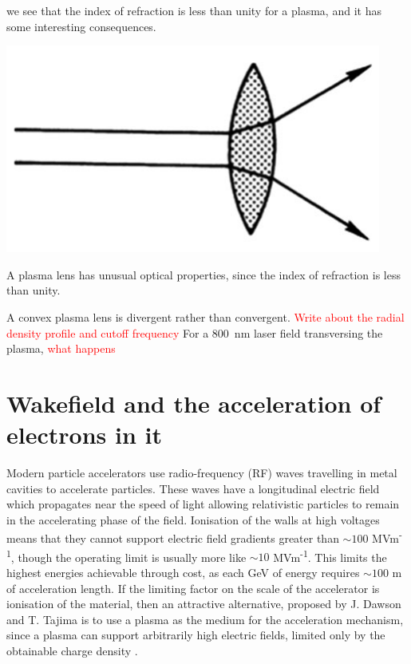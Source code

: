 \documentclass[justified,nofonts,nobib]{tufte-book}
\begin{document}
we see that the index of refraction is less than unity for a plasma, and it has some interesting consequences.
\begin{marginfigure}
    \includegraphics[width=\marginparwidth]{figures/chen4_30.PNG}
    \caption{A plasma lens has unusual optical properties, since the index of refraction is less than unity.}
    \label{fig:plasma_lens_chen}
\end{marginfigure}
A convex plasma lens is divergent rather than convergent.
\textcolor{red}{Write about the radial density profile and cutoff frequency}
For a \SI{800}{\nm} laser field transversing the plasma, \textcolor{red}{what happens}

\section{Wakefield and the acceleration of electrons in it}\label{sec:wakefield} 
Modern particle accelerators use radio-frequency (RF) waves travelling in metal cavities to accelerate particles. These waves have a longitudinal electric field which propagates near the speed of light allowing relativistic particles to remain in the accelerating phase of the field. Ionisation of the walls at high voltages means that they cannot support electric field gradients greater than $\sim 100$ MVm\textsuperscript{-1}, though the operating limit is usually more like $\sim 10$ MVm\textsuperscript{-1}. This limits the highest energies achievable through cost, as each GeV of energy requires $\sim 100$ m of acceleration length.
If the limiting factor on the scale of the accelerator is ionisation of the material, then an attractive alternative, proposed by J. Dawson and T. Tajima\cite{Tajima1979} is to use a plasma as the medium for the acceleration mechanism, since a plasma can support arbitrarily high electric fields, limited only by the obtainable charge density \cite{Esarey2009}.
\end{document}

